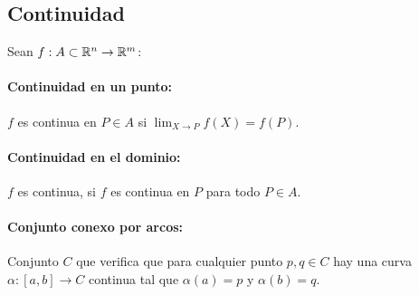 \subsection{Continuidad}
Sean $f : A\subset\mathbb{R}^n\rightarrow \mathbb{R}^m$:

\paragraph{Continuidad en un punto:} $f$ es continua en $P\in A$ si $\lim_{X\to P} f(X) = f(P)$.

\paragraph{Continuidad en el dominio:} $f$ es continua, si $f$ es continua en $P$ para todo $P\in A$.

\paragraph{Conjunto conexo por arcos: } Conjunto $C$ que verifica que para cualquier punto $p,q\in C$ hay una curva $\alpha:[a,b]\to C$ continua tal que $\alpha(a)=p$ y $\alpha(b) = q$.

